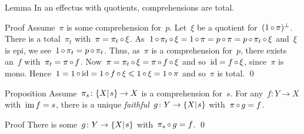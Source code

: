 \documentclass[b]{subfiles}
\begin{document}
\begin{parsec}
\begin{point}{Lemma}%
In an effectus with quotients, comprehensions are total.
\begin{point}{Proof}%
Assume~$\pi$ is some comprehension for~$p$.
Let~$\xi$ be a quotient for~$(1 \mathop{\circ} \pi)^\perp$.
There is a total~$\pi_t$ with~$\pi = \pi_t \mathop{\circ} \xi$.
As~$ 1 \mathop{\circ} \pi_t \mathop{\circ} \xi
        = 1 \mathop{\circ} \pi
        = p \mathop{\circ} \pi
        = p \mathop{\circ} \pi_t \mathop{\circ} \xi$
        and~$\xi$ is epi,
        we see~$1 \mathop{\circ} \pi_t = p \mathop{\circ} \pi_t$.
Thus, as~$\pi$ is a comprehension for~$p$,
    there exists an~$f$ with~$\pi_t = \pi \mathop{\circ} f$.
Now~$\pi = \pi_t \mathop{\circ} \xi = \pi \mathop{\circ} f \mathop{\circ} \xi$
    and so~$\operatorname{id} = f \mathop{\circ} \xi$, since~$\pi$ is mono.
Hence~$1 = 1 \mathop{\circ} \operatorname{id} =1 \mathop{\circ} f \mathop{\circ} \xi \leqslant 1 \mathop{\circ} \xi = 1 \mathop{\circ} \pi$
    and so~$\pi$ is total. \qed
\end{point}
\end{point}
\begin{point}{Proposition}%
Assume~$\pi_s\colon \{X|{\kern.2ex}s\} \to X$ is a comprehension for~$s$.
For any~$f\colon Y \to X$ with~$\operatorname{im} f = s$,
    there is a unique \emph{faithful}~$g\colon Y \to \{X|{\kern.2ex}s\}$
    with~$\pi \mathop{\circ} g = f$.
\begin{point}{Proof}
There is some~$g \colon Y \to \{X|{\kern.2ex}s\}$ with~$\pi_s \mathop{\circ} g = f$. \qed
\TODO{}
\end{point}
\end{point}
\end{parsec}
\end{document}
